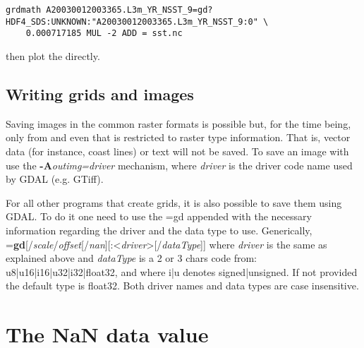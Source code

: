 \scriptsize
\begin{verbatim}
grdmath A20030012003365.L3m_YR_NSST_9=gd?HDF4_SDS:UNKNOWN:"A20030012003365.L3m_YR_NSST_9:0" \
	0.000717185 MUL -2 ADD = sst.nc
\end{verbatim}
\normalsize
\noindent
then plot the  directly.

\subsection{Writing grids and images}

Saving images in the common raster formats is possible but, for the time being, only from 
and even that is restricted to raster type information. That is, vector data (for instance, coast lines)
or text will not be saved. To save an image with \GMTprog{grdimage} use the \textbf{-A}{\it outimg=driver}
mechanism, where {\it driver} is the driver code name used by GDAL (e.g. GTiff).

For all other programs that create grids, it is also possible to save them using GDAL. To do it one need
to use the =gd appended with the necessary information regarding the driver and the data type to use.
Generically, ={\bf gd}[/{\it scale}/{\it offset}[/{\it nan}][:<{\it driver}>[/{\it dataType}]] 
where {\it driver} is the same as explained above and {\it dataType} is a 2 or 3 chars code from:
u8|u16|i16|u32|i32|float32, and where i|u denotes signed|unsigned. If not provided the default
type is float32. Both driver names and data types are case insensitive.


\section{The NaN data value}

